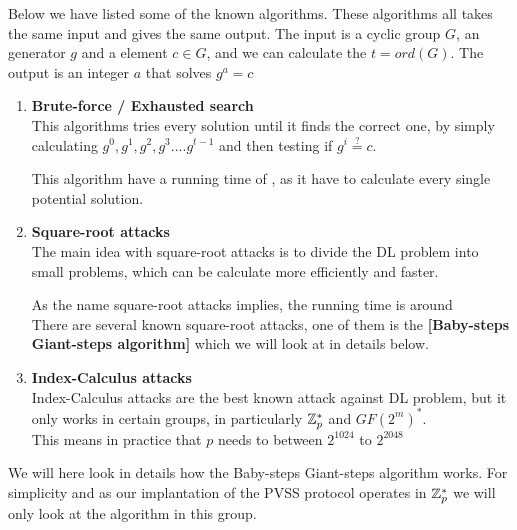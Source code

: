 \noindent
Below we have listed some of the known algorithms. These algorithms all takes the same input and gives the same output. The input is a cyclic group $G$, an generator $g$ and a element $c \in G$, and we can calculate the $t = ord(G)$. The output is an integer $a$ that solves $g^a = c$

\begin{enumerate}
    \item \textbf{Brute-force / Exhausted search} \\
    This algorithms tries every solution until it finds the correct one, by simply calculating
    $g^0, g^1, g^2, g^3....g^{t-1}$ and then testing if $g^i \stackrel{?}{=} c$.   
    
    \noindent
    This algorithm have a running time of , as it have to calculate
    every single potential solution. 
    
    \item \textbf{Square-root attacks} \\
    The main idea with square-root attacks is to divide the DL problem into small problems, which can be calculate more efficiently and faster. 
    
    \noindent
    As the name square-root attacks implies, the running time is around  \\

    \noindent
    There are several known square-root attacks, one of them is the \textbf{[Baby-steps Giant-steps algorithm]} which we will look at in details below. \\          
    
    \item \textbf{Index-Calculus attacks} \\
    Index-Calculus attacks are the best known attack against DL problem, but it only
    works in certain groups, in particularly $\mathbb{Z}_p^* $ and $ GF(2^m)^* $. \\
    
    This means in practice that $p$ needs to between $ 2^{1024} $ to $ 2^{2048}$
\end{enumerate}


We will here look in details how the Baby-steps Giant-steps algorithm works. For simplicity and as our implantation of the PVSS protocol operates in $\mathbb{Z}_p^*$ we will only look at the algorithm in this group. \\

